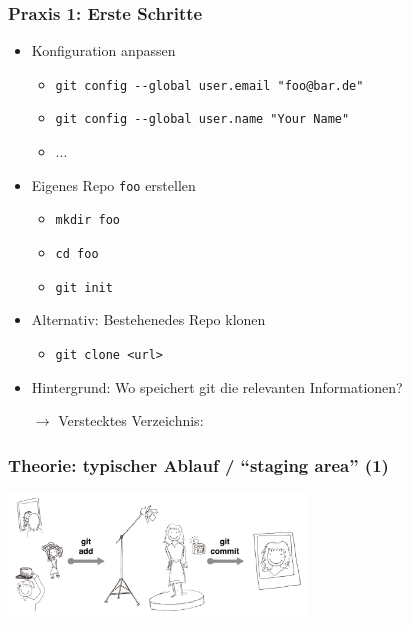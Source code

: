\documentclass{beamer}
\begin{document}

\begin{frame}[label=gitintro20]
\frametitle{Praxis 1: Erste Schritte}
\begin{itemize}
 \item Konfiguration anpassen
 \begin{itemize}
  \item \texttt{git config -{}-global user.email "foo@bar.de"}
  \item \texttt{git config -{}-global user.name "Your Name"}
  \item ...
 \end{itemize}

 \item Eigenes Repo \texttt{foo} erstellen
 \begin{itemize}
  \item \texttt{mkdir foo}
  \item \texttt{cd foo}
  \item \texttt{git init}
 \end{itemize}
 \item Alternativ: Bestehenedes Repo klonen
 \begin{itemize}
  \item \texttt{git clone <url>}
 \end{itemize}
 \item[]
 \pause
 \item Hintergrund: Wo speichert git die relevanten Informationen?
 \item[$\rightarrow$] Verstecktes Verzeichnis:


\end{itemize}

\end{frame}

\begin{frame}
  \frametitle{Theorie: typischer Ablauf / "`staging area"' (1)}
  \begin{center}
    \includegraphics[width=80mm]{img-src/git-staging-area}
  \end{center}
\end{frame}
\end{document}
